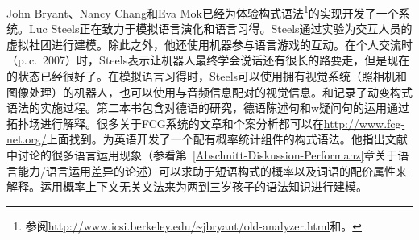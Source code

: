 John Bryant、Nancy Chang和Eva Mok已经为体验构式语法\footnote{%
  参阅\url{http://www.icsi.berkeley.edu/~jbryant/old-analyzer.html}和。
}的实现开发了一个系统。Luc Steels正在致力于模拟语言演化和语言习得\citep{Steels2003a}。Steels通过实验为交互人员的虚拟社团进行建模。除此之外，他还使用机器参与语言游戏的互动\citep{Steels2015a-u}。在个人交流时（p.\,c.\ 2007）时，Steels表示让机器人最终学会说话还有很长的路要走，但是现在的状态已经很好了。在模拟语言习得时，Steels可以使用拥有视觉系统（照相机和图像处理）的机器人，也可以使用与音频信息配对的视觉信息。和记录了动变构式语法的实施过程。第二本书包含对德语的研究，德语陈述句和w疑问句的运用通过拓扑场进行解释\citep{Micelli2012a}。很多关于FCG系统的文章和个案分析都可以在\url{http://www.fcg-net.org/}上面找到。\citet{Jurafsky96a}为英语开发了一个配有概率统计组件的构式语法。他指出文献中讨论的很多语言运用现象（参看第~\ref{Abschnitt-Diskussion-Performanz}章关于语言能力/语言运用差异的论述）可以求助于短语构式的概率以及词语的配价属性来解释。\citet*{BLT2009a}运用概率上下文无关文法来为两到三岁孩子的语法知识进行建模。
